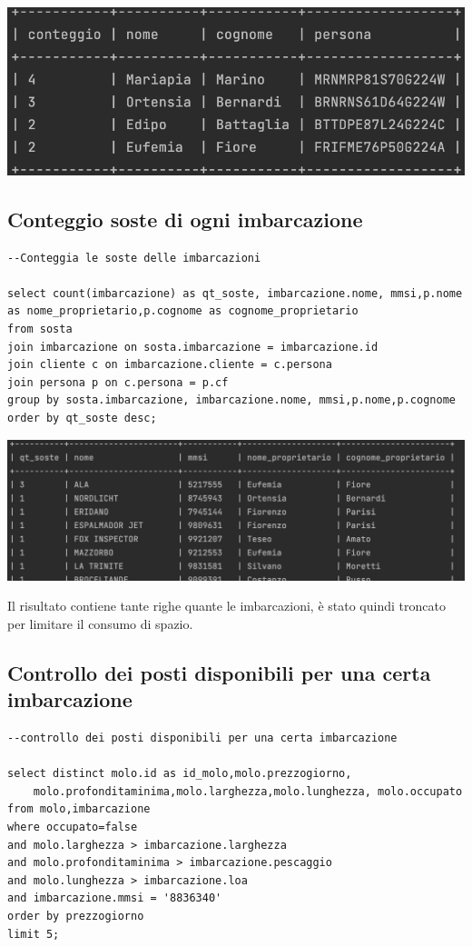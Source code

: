 \includegraphics[width=\linewidth]{img/result_2prenotazioni.png}

\subsection{Conteggio soste di ogni imbarcazione}

\begin{lstlisting}
--Conteggia le soste delle imbarcazioni

select count(imbarcazione) as qt_soste, imbarcazione.nome, mmsi,p.nome as nome_proprietario,p.cognome as cognome_proprietario
from sosta
join imbarcazione on sosta.imbarcazione = imbarcazione.id
join cliente c on imbarcazione.cliente = c.persona
join persona p on c.persona = p.cf
group by sosta.imbarcazione, imbarcazione.nome, mmsi,p.nome,p.cognome
order by qt_soste desc;
\end{lstlisting}

\includegraphics[width=\linewidth]{img/result_sosteimb.png}

Il risultato contiene tante righe quante le imbarcazioni, è stato quindi troncato per limitare il consumo di spazio.

\subsection{Controllo dei posti disponibili per una certa imbarcazione}
\begin{lstlisting}
--controllo dei posti disponibili per una certa imbarcazione

select distinct molo.id as id_molo,molo.prezzogiorno,
    molo.profonditaminima,molo.larghezza,molo.lunghezza, molo.occupato
from molo,imbarcazione
where occupato=false
and molo.larghezza > imbarcazione.larghezza
and molo.profonditaminima > imbarcazione.pescaggio
and molo.lunghezza > imbarcazione.loa
and imbarcazione.mmsi = '8836340'
order by prezzogiorno
limit 5;
\end{lstlisting}

